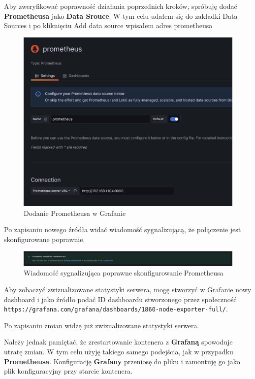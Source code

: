 \documentclass{article}
\begin{document}
Aby zweryfikować poprawność działania poprzednich kroków, spróbuję dodać \textbf{Prometheusa} jako \textbf{Data Srouce}. W tym celu udałem się do zakładki Data Sources i po kliknięciu Add data source wpisałem adres prometheusa

\begin{figure}[H]
    \centering
    \includegraphics[width=1\linewidth]{prometheusDodanieGrafana.png}
    \caption{Dodanie Prometheusa w Grafanie}
    \label{fig:enter-label}
\end{figure}

Po zapisaniu nowego źródła widać wiadomość sygnalizującą, że połączenie jest skonfigurowane poprawnie.

\begin{figure}[H]
    \centering
    \includegraphics[width=1\linewidth]{grafanaPoprawnyPrometheus.png}
    \caption{Wiadomość sygnalizująca poprawne skonfigurowanie Prometheusa}
    \label{fig:enter-label}
\end{figure}

Aby zobaczyć zwizualizowane statystyki serwera, mogę stworzyć w Grafanie nowy dashboard i jako źródło podać ID dashboardu stworzonego przez społeczność \lstinline|https://grafana.com/grafana/dashboards/1860-node-exporter-full/|.

Po zapisaniu zmian widzę już zwizualizowane statystyki serwera.

Należy jednak pamiętać, że zrestartowanie kontenera z \textbf{Grafaną} spowoduje utratę zmian. W tym celu użyję takiego samego podejścia, jak w przypadku \textbf{Prometheusa}. Konfigurację \textbf{Grafany} przeniosę do pliku i zamontuję go jako plik konfiguracyjny przy starcie kontenera.
\end{document}

